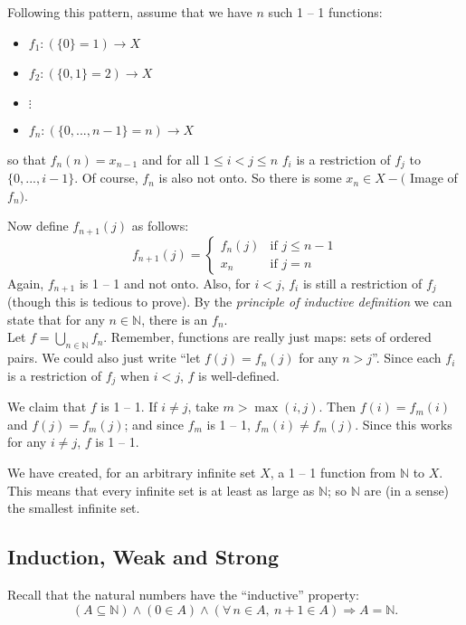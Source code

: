 \documentclass[12pt]{report}
\newcommand{\fall}{\forall\,}
\newcommand{\unionover}[2]{\bigcup_{#1 \in #2 }}
\newcommand{\naturals}{\mathbb{N}}
\begin{document}
Following this pattern, assume that we have $n$ such 1 -- 1 functions:
\begin{itemize}
\item[] $f_1:(\{0\} = 1) \rightarrow X$
\item[] $f_2:(\{0,1\} = 2) \rightarrow X$
\item[] $\vdots$
\item[] $f_n:(\{0,...,n-1\} = n) \rightarrow X$
\end{itemize}
so that $f_n(n)=x_{n-1}$ and for all $1 \leq i < j \leq n$ $f_i$ is a restriction
of $f_j$ to $\{0,...,i-1\}$. Of course, $f_n$ is also not onto. So there is
some $x_n \in X-($ Image of $f_n)$.

Now define $f_{n+1}(j)$ as follows: 
\begin{displaymath}
f_{n+1}(j) = \left\{ \begin{array}{ll}

f_n(j) & \textrm{if } j \leq n - 1\\
x_n & \textrm{if } j = n
\end{array} \right.
\end{displaymath}
Again, $f_{n+1}$ is 1 -- 1 and not onto. Also, for $i < j$, $f_i$ is still a
restriction of $f_j$ (though this is tedious to prove). By the
{\em principle of inductive definition} we can state that for any $n \in
\naturals$, there is an $f_n$.\\

Let $f = \unionover{n}{\naturals}f_n$. Remember, functions are really just
maps: sets of ordered pairs. We could also just write ``let $f(j) = f_n(j)$
for any $n > j$''. Since each $f_i$ is a restriction of $f_j$ when $i < j$,
$f$ is well-defined. 

We claim that $f$ is 1 -- 1. If $i \neq j$, take $m > \max(i,j)$. Then $f(i) =
f_m(i)$ and $f(j) = f_m(j)$; and since $f_m$ is 1 -- 1, $f_m(i) \neq f_m(j)$.
Since this works for any $i \neq j$, $f$ is 1 -- 1.

We have created, for an arbitrary infinite set $X$, a 1 -- 1 function from
$\naturals$ to $X$. This means that every infinite set is at least as large as
$\naturals$; so $\naturals$ are (in a sense) the smallest infinite set.\\

\subsection{Induction, Weak and Strong}

Recall that the natural numbers have the ``inductive'' property:
\begin{displaymath}
(A \subseteq \naturals) \land (0 \in A) \land (\fall n \in A,\ n + 1 \in A)
\Rightarrow A = \naturals.
\end{displaymath}
\end{document}
